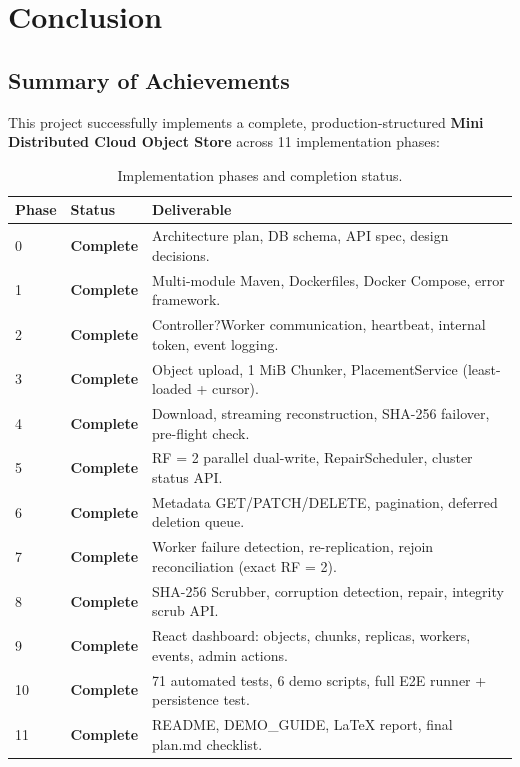 \documentclass[12pt,a4paper]{report}
\begin{document}
\chapter{Conclusion}

\section{Summary of Achievements}

This project successfully implements a complete, production-structured \textbf{Mini Distributed Cloud Object Store} across 11 implementation phases:

\begin{table}[H]
  \centering
  \caption{Implementation phases and completion status.}
  \label{tab:phases}
  \begin{tabularx}{\textwidth}{llX}
    \toprule
    \textbf{Phase} & \textbf{Status} & \textbf{Deliverable} \\
    \midrule
    0  & \textcolor{successgreen}{\textbf{Complete}} & Architecture plan, DB schema, API spec, design decisions. \\
    1  & \textcolor{successgreen}{\textbf{Complete}} & Multi-module Maven, Dockerfiles, Docker Compose, error framework. \\
    2  & \textcolor{successgreen}{\textbf{Complete}} & Controller?Worker communication, heartbeat, internal token, event logging. \\
    3  & \textcolor{successgreen}{\textbf{Complete}} & Object upload, 1 MiB Chunker, PlacementService (least-loaded + cursor). \\
    4  & \textcolor{successgreen}{\textbf{Complete}} & Download, streaming reconstruction, SHA-256 failover, pre-flight check. \\
    5  & \textcolor{successgreen}{\textbf{Complete}} & RF = 2 parallel dual-write, RepairScheduler, cluster status API. \\
    6  & \textcolor{successgreen}{\textbf{Complete}} & Metadata GET/PATCH/DELETE, pagination, deferred deletion queue. \\
    7  & \textcolor{successgreen}{\textbf{Complete}} & Worker failure detection, re-replication, rejoin reconciliation (exact RF = 2). \\
    8  & \textcolor{successgreen}{\textbf{Complete}} & SHA-256 Scrubber, corruption detection, repair, integrity scrub API. \\
    9  & \textcolor{successgreen}{\textbf{Complete}} & React dashboard: objects, chunks, replicas, workers, events, admin actions. \\
    10 & \textcolor{successgreen}{\textbf{Complete}} & 71 automated tests, 6 demo scripts, full E2E runner + persistence test. \\
    11 & \textcolor{successgreen}{\textbf{Complete}} & README, DEMO\_GUIDE, LaTeX report, final plan.md checklist. \\
    \bottomrule
  \end{tabularx}
\end{table}
\end{document}
